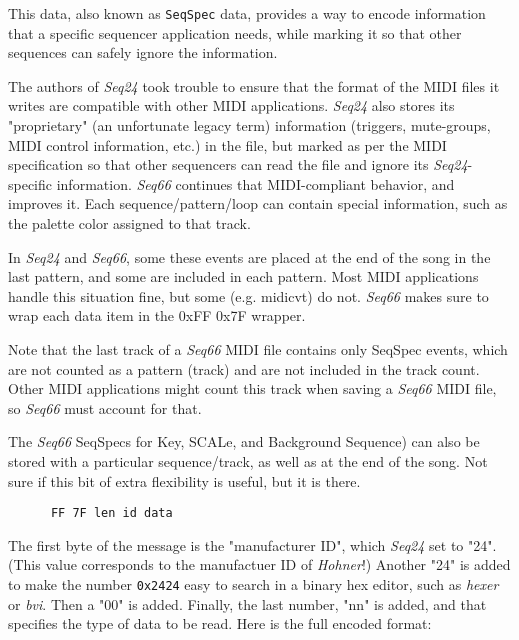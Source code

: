    This data, also known as
   \texttt{SeqSpec} data, provides a way to encode information
   that a specific sequencer application needs, while marking it so that other
   sequences can safely ignore the information.

   The authors of \textsl{Seq24} took trouble to ensure that the format
   of the MIDI files it writes are compatible with other MIDI applications.
   \textsl{Seq24} also stores its "proprietary" (an unfortunate legacy term)
   information (triggers, mute-groups, MIDI control
   information, etc.) in the file, but marked as per the MIDI specification
   so that other sequencers can read
   the file and ignore its \textsl{Seq24}-specific information.
   \textsl{Seq66} continues that MIDI-compliant behavior, and improves it.
   Each sequence/pattern/loop can contain special information, such as the
   palette color assigned to that track.

   In \textsl{Seq24} and \textsl{Seq66},
   some these events are placed at the end of the song in the last pattern,
   and some are included in each pattern.
   Most MIDI applications handle this situation
   fine, but some (e.g. midicvt) do not.  \textsl{Seq66} makes
   sure to wrap each data item in the 0xFF 0x7F wrapper.

   Note that the last track of a \textsl{Seq66} MIDI file contains
   only SeqSpec events, which are not counted as a pattern (track) and
   are not included in the track count.
   Other MIDI applications might count this track when saving a
   \textsl{Seq66} MIDI file, so \textsl{Seq66} must account for that.

   The \textsl{Seq66} SeqSpecs for Key, SCALe, and Background Sequence)
   can also be stored with a particular sequence/track,
   as well as at the end of the song.
   Not sure if this bit of extra
   flexibility is useful, but it is there.

   \begin{verbatim}
      FF 7F len id data
   \end{verbatim}

   The first byte of the message is the "manufacturer ID",
   which \textsl{Seq24} set to "24".
   (This value corresponds to the manufactuer ID of \textsl{Hohner}!)
   Another "24" is added to make the number \texttt{0x2424}
   easy to search in a binary hex editor, such as \textsl{hexer} or
   \textsl{bvi}.
   Then a "00" is added.  Finally, the last number, "nn" is added, and that
   specifies the type of data to be read.  Here is the full encoded
   format:


